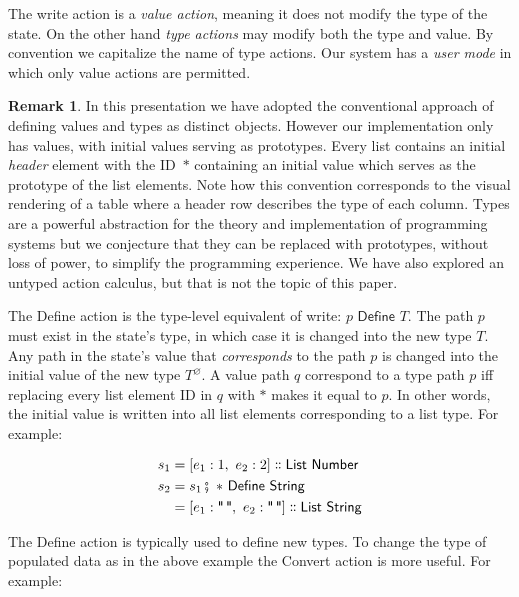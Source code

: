 \documentclass[english,submission]{programming}
\theoremstyle{definition}
\newtheorem*{remark}{Remark}
\newcommand{\mathbox}[1]{\colorbox{black!10}{$#1$}}
\DeclareMathOperator{\exec}{\fatsemi\ }
\newcommand{\isa}{\dblcolon}
\newcommand{\emptystring}{\textsf{\textquotedbl\ \!\textquotedbl}}
\begin{document}
The \textsf{write} action is a \textit{value action}, meaning it does not modify the type of the state. On the other hand \textit{type actions} may modify both the type and value. By convention we capitalize the name of type actions. Our system has a \textit{user mode} in which only value actions are permitted.

\begin{remark}
In this presentation we have adopted the conventional approach of defining values and types as distinct objects. However our implementation only has values, with initial values serving as prototypes. Every list contains an initial \textit{header} element with the ID~\mathbox{*} containing an initial value which serves as the prototype of the list elements. Note how this convention corresponds to the visual rendering of a table where a header row describes the type of each column. Types are a powerful abstraction for the theory and implementation of programming systems but we conjecture that they can be replaced with prototypes, without loss of power, to simplify the programming experience. We have also explored an untyped action calculus\cite{denicek}, but that is not the topic of this paper.
\end{remark}

The \textsf{Define} action is the type-level equivalent of \textsf{write}: \mathbox{p \textsf{ Define } T}. The path $p$ must exist in the state's type, in which case it is changed into the new type $T$. Any path in the state's value that \textit{corresponds} to the path $p$ is changed into the initial value of the new type $T^\varnothing$. A value path $q$ correspond to a type path $p$ iff replacing every list element ID in $q$ with $*$ makes it equal to $p$. In other words, the initial value is written into all list elements corresponding to a list type. For example:


\begin{align*}
s_1 &= [ e_1: 1,\  e_2: 2] \isa \textsf{List Number}\\
s_2 &= s_1 \exec * \textsf{ Define } \textsf{String}\\
    &= [ e_1: \emptystring,\  e_2: \emptystring] \isa \textsf{List String}\\
\end{align*}

The \textsf{Define} action is typically used to define new types. To change the type of populated data as in the above example the \textsf{Convert} action is more useful. For example:
\end{document}
